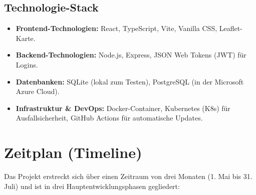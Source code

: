 \documentclass[11pt,a4paper]{article}
\begin{document}
\subsection{Technologie-Stack}
\begin{itemize}
    \item \textbf{\color{accentblue}Frontend-Technologien:} React, TypeScript, Vite, Vanilla CSS, Leaflet-Karte.
    \item \textbf{\color{accentblue}Backend-Technologien:} Node.js, Express, JSON Web Tokens (JWT) für Logins.
    \item \textbf{\color{accentblue}Datenbanken:} SQLite (lokal zum Testen), PostgreSQL (in der Microsoft Azure Cloud).
    \item \textbf{\color{accentblue}Infrastruktur \& DevOps:} Docker-Container, Kubernetes (K8s) für Ausfallsicherheit, GitHub Actions für automatische Updates.
\end{itemize}

\newpage

\section{Zeitplan (Timeline)}
Das Projekt erstreckt sich über einen Zeitraum von drei Monaten (1. Mai bis 31. Juli) und ist in drei Hauptentwicklungsphasen gegliedert:
\end{document}
